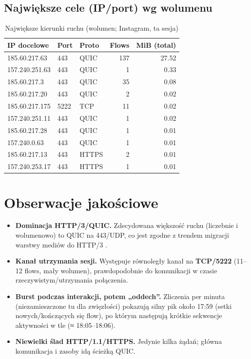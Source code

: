 \subsection{Największe cele (IP/port) wg wolumenu}
\begin{table}[htbp]
  \centering
  \caption{Największe kierunki ruchu (wolumen; Instagram, ta sesja)}
  \label{tab:insta-topdst}
  \begin{tabular}{lllrr}
    \toprule
    \textbf{IP docelowe} & \textbf{Port} & \textbf{Proto} & \textbf{Flows} & \textbf{MiB (total)} \\
    \midrule
    185.60.217.63  & 443  & QUIC  & 137 & 27.52 \\
    157.240.251.63 & 443  & QUIC  & 1   & 0.33 \\
    185.60.217.3   & 443  & QUIC  & 35  & 0.08 \\
    185.60.217.20  & 443  & QUIC  & 2   & 0.02 \\
    185.60.217.175 & 5222 & TCP   & 11  & 0.02 \\
    157.240.251.11 & 443  & QUIC  & 1   & 0.02 \\
    185.60.217.28  & 443  & QUIC  & 1   & 0.01 \\
    157.240.0.63   & 443  & QUIC  & 1   & 0.01 \\
    185.60.217.13  & 443  & HTTPS & 2   & 0.01 \\
    157.240.253.17 & 443  & HTTPS & 1   & 0.01 \\
    \bottomrule
  \end{tabular}
\end{table}

\section{Obserwacje jakościowe}
\begin{itemize}
  \item \textbf{Dominacja HTTP/3/QUIC.} Zdecydowana większość ruchu (liczebnie i wolumenowo) to QUIC na 443/UDP, co jest zgodne z trendem migracji warstwy mediów do HTTP/3 \cite{RFC9114,RFC9000}.
  \item \textbf{Kanał utrzymania sesji.} Występuje równoległy kanał na \textbf{TCP/5222} (11--12 flows, mały wolumen), prawdopodobnie do komunikacji w czasie rzeczywistym/utrzymania połączenia.
  \item \textbf{Burst podczas interakcji, potem „oddech”.} Zliczenia per minuta (niezamieszczone tu dla zwięzłości) pokazują silny pik około 17{:}59 (setki nowych/kończących się flow), po którym następują krótkie sekwencje aktywności w tle (≈ 18{:}05–18{:}06).
  \item \textbf{Niewielki ślad HTTP/1.1/HTTPS.} Jedynie kilka żądań; główna komunikacja i zasoby idą ścieżką QUIC.
\end{itemize}

